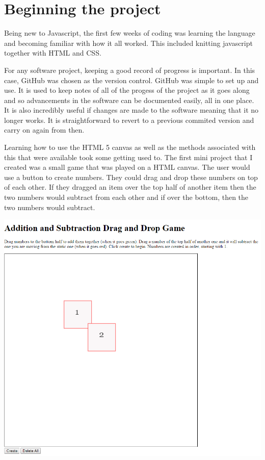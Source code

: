 \section{Beginning the project}

Being new to Javascript, the first few weeks of coding was learning the language and becoming familiar with how it all worked. This included knitting javascript together with HTML and CSS.

For any software project, keeping a good record of progress is important. In this case, GitHub was chosen as the version control. GitHub was simple to set up and use. It is used to keep notes of all of the progess of the project as it goes along and so advancements in the software can be documented easily, all in one place. It is also incredibly useful if changes are made to the software meaning that it no longer works. It is straightforward to revert to a previous commited version and carry on again from then.

Learning how to use the HTML 5 canvas as well as the methods associated with this that were available took some getting used to. The first mini project that I created was a small game that was played on a HTML canvas. The user would use a button to create numbers. They could drag and drop these numbers on top of each other. If they dragged an item over the top half of another item then the two numbers would subtract from each other and if over the bottom, then the two numbers would subtract.

\includegraphics[scale=0.5]{addition1}

